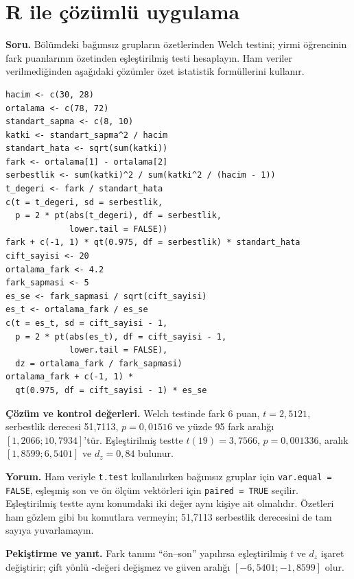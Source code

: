 \section{R ile çözümlü uygulama}
\label{sec:r-b11}

\textbf{Soru.} Bölümdeki bağımsız grupların özetlerinden Welch testini;
yirmi öğrencinin fark puanlarının özetinden eşleştirilmiş testi hesaplayın.
Ham veriler verilmediğinden aşağıdaki çözümler özet istatistik formüllerini kullanır.

\begin{lstlisting}[style=prismR]
hacim <- c(30, 28)
ortalama <- c(78, 72)
standart_sapma <- c(8, 10)
katki <- standart_sapma^2 / hacim
standart_hata <- sqrt(sum(katki))
fark <- ortalama[1] - ortalama[2]
serbestlik <- sum(katki)^2 / sum(katki^2 / (hacim - 1))
t_degeri <- fark / standart_hata
c(t = t_degeri, sd = serbestlik,
  p = 2 * pt(abs(t_degeri), df = serbestlik,
             lower.tail = FALSE))
fark + c(-1, 1) * qt(0.975, df = serbestlik) * standart_hata
cift_sayisi <- 20
ortalama_fark <- 4.2
fark_sapmasi <- 5
es_se <- fark_sapmasi / sqrt(cift_sayisi)
es_t <- ortalama_fark / es_se
c(t = es_t, sd = cift_sayisi - 1,
  p = 2 * pt(abs(es_t), df = cift_sayisi - 1,
             lower.tail = FALSE),
  dz = ortalama_fark / fark_sapmasi)
ortalama_fark + c(-1, 1) *
  qt(0.975, df = cift_sayisi - 1) * es_se
\end{lstlisting}

\begin{outputguidebox}
\textbf{Çözüm ve kontrol değerleri.} Welch testinde fark 6 puan,
$t=2{,}5121$, serbestlik derecesi 51,7113, $p=0{,}01516$ ve yüzde 95
fark aralığı $[1{,}2066;10{,}7934]$'tür. Eşleştirilmiş testte
$t(19)=3{,}7566$, $p=0{,}001336$, aralık $[1{,}8599;6{,}5401]$ ve
$d_z=0{,}84$ bulunur.
\end{outputguidebox}

\textbf{Yorum.} Ham veriyle \texttt{t.test} kullanılırken bağımsız gruplar
için \texttt{var.equal = FALSE}, eşleşmiş son ve ön ölçüm vektörleri için
\texttt{paired = TRUE} seçilir. Eşleştirilmiş testte aynı
konumdaki iki değer aynı kişiye ait olmalıdır. Özetleri ham gözlem gibi bu
komutlara vermeyin; 51,7113 serbestlik derecesini de tam sayıya yuvarlamayın.

\textbf{Pekiştirme ve yanıt.} Fark tanımı ``ön--son'' yapılırsa eşleştirilmiş
$t$ ve $d_z$ işaret değiştirir; çift yönlü \pval-değeri değişmez ve güven
aralığı $[-6{,}5401;-1{,}8599]$ olur.